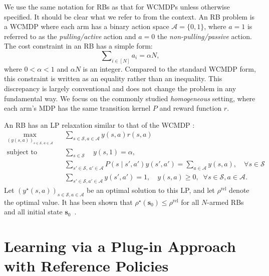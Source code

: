 \documentclass[mnsc,nonblindrev]{informs3}
\newcommand{\bms}{\bm{s}}
\newcommand{\rhorel}{\rho^{\mathrm{rel}}}
\newcommand{\States}{\mathcal{S}}
\newcommand{\Actions}{\mathcal{A}}
\begin{document}
We use the same notation for RBs as that for WCMDPs unless otherwise specified. It should be clear what we refer to from the context.
An RB problem is a WCMDP where each arm has a binary action space
$\mathcal A = \{0,1\}$, where
$a=1$ is referred to as the \emph{pulling/active} action and $a=0$ the \emph{non-pulling/passive} action.
The cost constraint in an RB has a simple form:
\vspace{-0.05cm}\[
\sum\nolimits_{i\in[N]} a_i = \alpha N,
\]
where $0<\alpha < 1$ and $\alpha N$ is an integer.
Compared to the standard WCMDP form, this constraint is written as an equality rather than an inequality.
This discrepancy is largely conventional and does not change the problem in any fundamental way.
We focus on the commonly studied \emph{homogeneous} setting, where each arm's MDP has the same transition kernel $P$ and reward function $r$.


An RB has an LP relaxation similar to that of the WCMDP \citep{hong2024achieving}:
\vspace{-0.05cm}\begin{subequations}\label{eq:lprelax-rb}
\begin{align}
\max_{(y(s,a))_{s\in\mathcal{S},\,a\in\mathcal{A}}}\mspace{15mu}&\sum\nolimits_{s\in\mathcal{S},a\in\mathcal{A}}  y(s, a) r(s, a)\label{eq:lp-rb-objective}\\
    \text{subject to}\mspace{21mu}
    &\mspace{0mu}\sum\nolimits_{s\in\mathcal{S}} \quad y(s, 1) = \alpha, \label{eq:expect-budget-constraint}\\ &\sum\nolimits_{s'\in\mathcal{S},\,a'\in\mathcal{A}} P(s \mid s',a') y(s',a') = \sum\nolimits_{a\in\mathcal{A}} y(s,a), \quad \forall s\in\mathcal{S} \label{eq:flow-balance-equation}\\
    &\mspace{0mu}\sum\nolimits_{s'\in\mathcal{S}, a'\in\mathcal{A}} y(s',a') = 1,  %
    \quad
     y(s,a) \geq 0, \;\; \forall s\in\mathcal{S}, a\in\mathcal{A}.  \label{eq:non-negative-constraint}
\end{align}
\end{subequations}
Let $(y^\star(s,a))_{s\in\States,a\in\Actions}$ be an optimal solution to this LP, and let $\rhorel$ denote the optimal value. It has been shown that $\rho^\star(\bms_0)\le \rhorel$ for all $N$-armed RBs and all initial state $\bms_0$~\citep{hong2024unichain}.


\section{Learning via a Plug-in Approach with Reference Policies}
\end{document}
